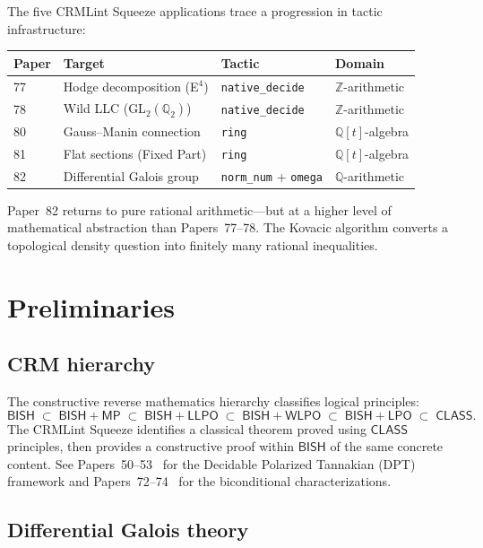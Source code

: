 \documentclass[11pt]{article}
\theoremstyle{plain}
\theoremstyle{definition}
\theoremstyle{remark}
\newcommand{\Z}{\mathbb{Z}}
\newcommand{\Q}{\mathbb{Q}}
\newcommand{\BISH}{\mathsf{BISH}}
\newcommand{\LPO}{\mathsf{LPO}}
\newcommand{\WLPO}{\mathsf{WLPO}}
\newcommand{\LLPO}{\mathsf{LLPO}}
\newcommand{\MP}{\mathsf{MP}}
\newcommand{\CLASS}{\mathsf{CLASS}}
\begin{document}
The five CRMLint Squeeze applications trace a progression in tactic infrastructure:
\begin{center}
\renewcommand{\arraystretch}{1.1}
\begin{tabular}{@{}llll@{}}
\toprule
Paper & Target & Tactic & Domain \\
\midrule
77 & Hodge decomposition (E$^4$) & \texttt{native\_decide} & $\Z$-arithmetic \\
78 & Wild LLC (GL$_2(\Q_2)$) & \texttt{native\_decide} & $\Z$-arithmetic \\
80 & Gauss--Manin connection & \texttt{ring} & $\Q[t]$-algebra \\
81 & Flat sections (Fixed Part) & \texttt{ring} & $\Q[t]$-algebra \\
82 & Differential Galois group & \texttt{norm\_num} + \texttt{omega} & $\Q$-arithmetic \\
\bottomrule
\end{tabular}
\end{center}

\noindent
Paper~82 returns to pure rational arithmetic---but at a higher level of mathematical abstraction than Papers~77--78.
The Kovacic algorithm converts a topological density question into finitely many rational inequalities.

\section{Preliminaries}
\label{sec:prelim}

\subsection{CRM hierarchy}

The constructive reverse mathematics hierarchy classifies logical principles:
\[
  \BISH \;\subset\; \BISH + \MP \;\subset\; \BISH + \LLPO \;\subset\; \BISH + \WLPO \;\subset\; \BISH + \LPO \;\subset\; \CLASS.
\]
The CRMLint Squeeze identifies a classical theorem proved using $\CLASS$ principles, then provides a constructive proof within $\BISH$ of the same concrete content.
See Papers~50--53~\cite{Lee2024P50} for the Decidable Polarized Tannakian (DPT) framework and Papers~72--74~\cite{Lee2025P72} for the biconditional characterizations.

\subsection{Differential Galois theory}
\end{document}
